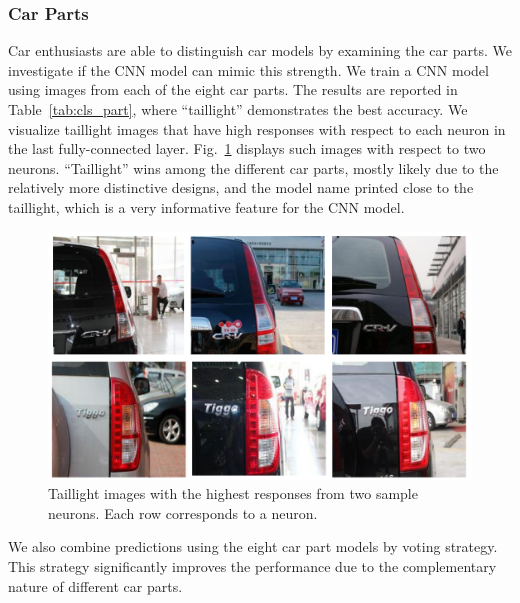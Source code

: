 \documentclass[10pt,twocolumn,letterpaper]{article}
\begin{document}
\subsubsection{Car Parts}

Car enthusiasts are able to distinguish car models by examining the car parts. We investigate if the CNN model can mimic this strength.
%
We train a CNN model using images from each of the eight car parts. The results are reported in Table~\ref{tab:cls_part}, where ``taillight'' demonstrates the best accuracy.
%
We visualize taillight images that have high responses with respect to each neuron in the last fully-connected layer. Fig.~\ref{fig:part_response} displays such images with respect to two neurons. ``Taillight'' wins among the different car parts, mostly likely due to the relatively more distinctive designs, and the model name printed close to the taillight, which is a very informative feature for the CNN model.


\begin{figure}[t]\centering
\includegraphics[width=0.7\linewidth]{part_response.pdf}
\caption{Taillight images with the highest responses from two sample neurons. Each row corresponds to a neuron.}
\label{fig:part_response}
\end{figure}
%
We also combine predictions using the eight car part models by voting strategy. This strategy significantly improves the performance due to the complementary nature of different car parts.
\end{document}
